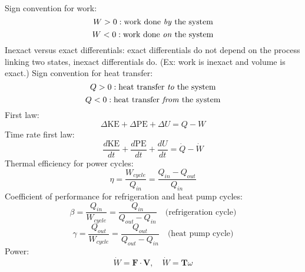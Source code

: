 \documentclass[paper=letter, fontsize=11pt]{scrartcl}
\numberwithin{equation}{section}        %
\numberwithin{figure}{section}          %
\numberwithin{table}{section}               %
\begin{document}
Sign convention for work:
\begin{equation}
W > 0:\text{work done \textit{by} the system}
\end{equation}
\begin{equation}
W < 0:\text{work done \textit{on} the system}
\end{equation}
\newline
\newline
Inexact versus exact differentials: exact differentials do not depend on the process linking two states, inexact differentials do. (Ex: work is inexact and volume is exact.)
\newline
\newline
Sign convention for heat transfer:
\begin{equation}
Q > 0:\text{heat transfer \textit{to} the system}
\end{equation}
\begin{equation}
Q < 0:\text{heat transfer \textit{from} the system}
\end{equation}
\newline
\newline
First law:
\begin{equation}
    \Delta \text{KE} + \Delta \text{PE} + \Delta U = Q - W
\end{equation}
\newline
\newline
Time rate first law:
\begin{equation}
    \frac{d\text{KE}}{dt} + \frac{d\text{PE}}{dt} + \frac{dU}{dt} = \dot Q - \dot W
\end{equation}
\newline
\newline
Thermal efficiency for power cycles:
\begin{equation}
\eta = \frac{W_{cycle}}{Q_{in}} = \frac{Q_{in}-Q_{out}}{Q_{in}}
\end{equation}
\newline
\newline
Coefficient of performance for refrigeration and heat pump cycles:
\begin{equation}
\beta = \frac{Q_{in}}{W_{cycle}} = \frac{Q_{in}}{Q_{out}-Q_{in}}\quad\text{(refrigeration cycle)}
\end{equation}
\begin{equation}
\gamma = \frac{Q_{out}}{W_{cycle}} = \frac{Q_{out}}{Q_{out}-Q_{in}}\quad\text{(heat pump cycle)}
\end{equation}
\newline
\newline
Power:
\begin{equation}
    \dot W = \mathbf{F}\cdot\mathbf{V},\quad\dot W = \mathbf{T}\omega
\end{equation}
\end{document}
